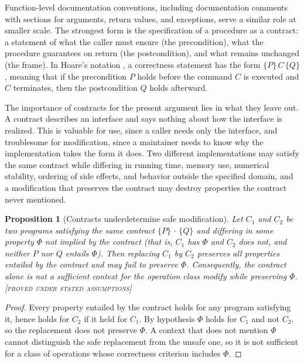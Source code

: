 \documentclass[11pt,twoside,openright]{book}
\theoremstyle{plain}
\newtheorem{proposition}[theorem]{Proposition}
\theoremstyle{definition}
\theoremstyle{remark}
\newcommand{\Proved}{\textup{\textsc{[proved under stated assumptions]}}}
\begin{document}
Function-level documentation conventions, including documentation comments with sections for arguments, return values, and exceptions, serve a similar role at smaller scale. The strongest form is the specification of a procedure as a contract: a statement of what the caller must ensure (the precondition), what the procedure guarantees on return (the postcondition), and what remains unchanged (the frame). In Hoare's notation \cite{hoare1969}, a correctness statement has the form $\{P\}\,C\,\{Q\}$, meaning that if the precondition $P$ holds before the command $C$ is executed and $C$ terminates, then the postcondition $Q$ holds afterward.

The importance of contracts for the present argument lies in what they leave out. A contract describes an interface and says nothing about how the interface is realized. This is valuable for use, since a caller needs only the interface, and troublesome for modification, since a maintainer needs to know why the implementation takes the form it does. Two different implementations may satisfy the same contract while differing in running time, memory use, numerical stability, ordering of side effects, and behavior outside the specified domain, and a modification that preserves the contract may destroy properties the contract never mentioned.

\begin{proposition}[Contracts underdetermine safe modification]\label{prop:contract}
Let $C_1$ and $C_2$ be two programs satisfying the same contract $\{P\}\,\cdot\,\{Q\}$ and differing in some property $\Phi$ not implied by the contract (that is, $C_1$ has $\Phi$ and $C_2$ does not, and neither $P$ nor $Q$ entails $\Phi$). Then replacing $C_1$ by $C_2$ preserves all properties entailed by the contract and may fail to preserve $\Phi$. Consequently, the contract alone is not a sufficient context for the operation class \emph{modify while preserving $\Phi$}.
\Proved{}
\end{proposition}

\begin{proof}
Every property entailed by the contract holds for any program satisfying it, hence holds for $C_2$ if it held for $C_1$. By hypothesis $\Phi$ holds for $C_1$ and not $C_2$, so the replacement does not preserve $\Phi$. A context that does not mention $\Phi$ cannot distinguish the safe replacement from the unsafe one, so it is not sufficient for a class of operations whose correctness criterion includes $\Phi$.
\end{proof}
\end{document}
